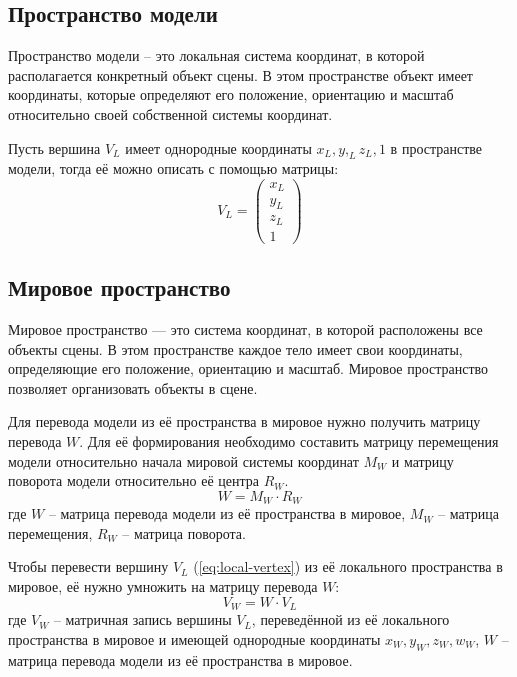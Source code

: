 \subsection{Пространство модели}

Пространство модели -- это локальная система координат, в которой располагается конкретный объект сцены. В этом пространстве объект имеет координаты, которые определяют его положение, ориентацию и масштаб относительно своей собственной системы координат. 

Пусть вершина $V_L$ имеет однородные координаты $x_L, y,_L z_L, 1$ в пространстве модели, тогда её можно описать с помощью матрицы:
\begin{equation}
	V_L = 
	\begin{pmatrix}
		x_L \\
		y_L \\
		z_L \\
		1
	\end{pmatrix}
	\label{eq:local-vertex}
\end{equation}

\subsection{Мировое пространство}

Мировое пространство — это система координат, в которой расположены все объекты сцены. В этом пространстве каждое тело имеет свои координаты, определяющие его положение, ориентацию и масштаб. Мировое пространство позволяет организовать объекты в сцене.

Для перевода модели из её пространства в мировое нужно получить матрицу перевода $W$. Для её формирования необходимо составить матрицу перемещения модели относительно начала мировой системы координат $M_W$ и матрицу поворота модели относительно её центра $R_W$.
\begin{equation}
	W = M_W \cdot R_W
\end{equation}
где $W$ -- матрица перевода модели из её пространства в мировое, $M_W$ -- матрица перемещения, $R_W$ -- матрица поворота.

Чтобы перевести вершину $V_L$ (\ref{eq:local-vertex}) из её локального пространства в мировое, её нужно умножить на матрицу перевода $W$:
\begin{equation}
	V_W = W \cdot V_L
	\label{eq:world-vertex}
\end{equation}
где $V_W$ -- матричная запись вершины $V_L$, переведённой из её локального пространства в мировое и имеющей однородные координаты $x_W, y_W, z_W, w_W$, $W$ -- матрица перевода модели из её пространства в мировое.

